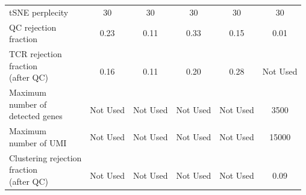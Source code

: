 \begin{table}[htp!]
\begin{tabular}{l|c c c c c}
tSNE perplecity & 30 & 30 & 30 & 30 & 30\\

\specialcell[t]{QC rejection\\fraction} & 0.23 & 0.11 & 0.33 & 0.15 & 0.01\\

\specialcell[t]{TCR rejection\\fraction\\(after QC)} & \specialcell[t]{ \\0.16\\ } & \specialcell[t]{ \\0.11\\ } & \specialcell[t]{ \\0.20\\ } & \specialcell[t]{ \\0.28\\ } & \specialcell[t]{ \\Not Used\\ }\\

\specialcell[t]{Maximum\\number of\\detected genes} & \specialcell[t]{ \\Not Used\\ } & \specialcell[t]{ \\Not Used\\ } & \specialcell[t]{ \\Not Used\\ } & \specialcell[t]{ \\Not Used\\ } & \specialcell[t]{ \\3500\\ }\\

\specialcell[t]{Maximum\\number of UMI} & Not Used & Not Used & Not Used & Not Used & 15000\\

\specialcell[t]{Clustering rejection\\fraction\\(after QC)} & \specialcell[t]{ \\Not Used\\ } & \specialcell[t]{ \\Not Used\\ } & \specialcell[t]{ \\Not Used\\ } & \specialcell[t]{ \\Not Used\\ } & \specialcell[t]{ \\0.09\\ }\\
\hline 
\end{tabular}
\end{table}

